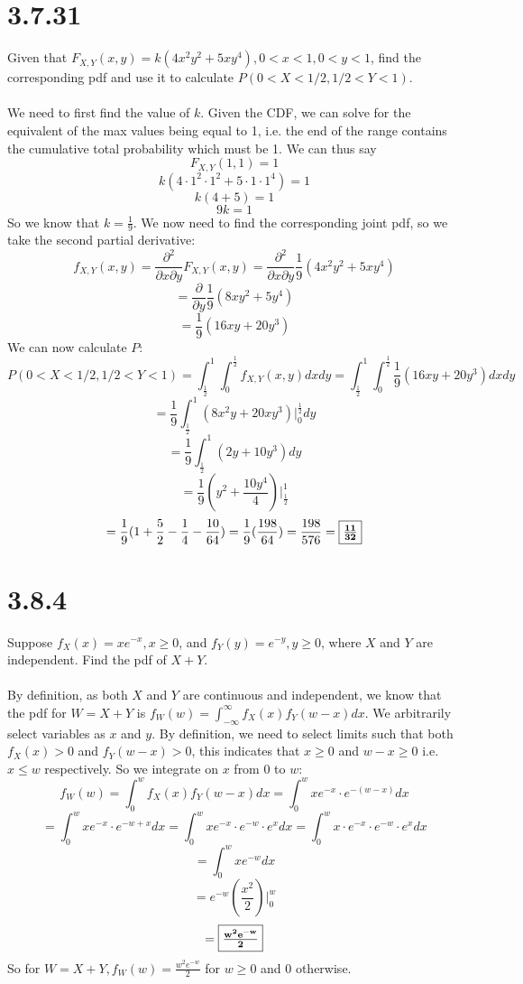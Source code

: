 \documentclass{article}
\begin{document}
{\section*{3.7.31} 
Given that \(F_{X,Y} (x, y) = k(4x^2y^2 + 5xy^4), 0 < x <1, 0 < y < 1\), find the corresponding pdf and use it to calculate \(P(0 < X < 1/2, 1/2 < Y < 1)\).
\\
\\
We need to first find the value of \(k\). Given the CDF, we can solve for the equivalent of the max values being equal to 1, i.e. the end of the range contains the cumulative total probability which must be 1. We can thus say 
\[
F_{X,Y}(1,1) = 1
\]
\[
k(4\cdot 1^2 \cdot 1^2 + 5 \cdot 1 \cdot 1^4) = 1
\]
\[
k(4 + 5) = 1
\]
\[
9k = 1
\]
So we know that \(k = \frac{1}{9}\). We now need to find the corresponding joint pdf, so we take the second partial derivative:
\[
f_{X,Y} (x,y) = \frac{\partial^2}{\partial x \partial y}F_{X,Y} (x,y) = \frac{\partial^2}{\partial x \partial y} \frac{1}{9}(4x^2y^2 + 5xy^4)
\]
\[
= \frac{\partial}{\partial y} \frac{1}{9}(8xy^2 + 5y^4)
\]
\[
= \frac{1}{9}(16xy + 20y^3)
\]
We can now calculate \(P\):
\[
P(0 < X < 1/2, 1/2 < Y < 1) = \int_{\frac{1}{2}}^{1} \int_{0}^{\frac{1}{2}} f_{X,Y} (x,y) dx dy = \int_{\frac{1}{2}}^{1} \int_{0}^{\frac{1}{2}} \frac{1}{9} (16xy + 20y^3) dx dy
\]
\[
= \frac{1}{9} \int_{\frac{1}{2}}^{1} (8x^2y + 20xy^3) \Big|_{0}^{\frac{1}{2}} dy
\]
\[
= \frac{1}{9} \int_{\frac{1}{2}}^{1} (2y + 10y^3) dy
\]
\[
= \frac{1}{9} (y^2 + \frac{10y^4}{4}) \Big|_{\frac{1}{2}}^{1}
\]
\[
= \frac{1}{9} (1 + \frac{5}{2} - \frac{1}{4} - \frac{10}{64}) = \frac{1}{9}(\frac{198}{64}) = \frac{198}{576} = \fbox{\(\mathbf{\frac{11}{32}}\)}
\]


\section*{3.8.4} 
Suppose \(f_X (x) = xe^{-x}, x \geq 0\), and \(f_Y (y) = e^{-y}, y \geq 0\), where
\(X\) and \(Y\) are independent. Find the pdf of \(X + Y\).
\\
\\
By definition, as both \(X\) and \(Y\) are continuous and independent, we know that the pdf for \(W = X + Y\) is \(f_W(w) = \int_{-\infty}^{\infty}f_X(x)f_Y(w-x)dx\). We arbitrarily select variables as \(x\) and \(y\). By definition, we need to select limits such that both \(f_X(x) > 0\) and \(f_Y(w - x) > 0\), this indicates that \(x \geq 0 \) and \(w - x \geq 0\) i.e. \(x \leq w\) respectively. So we integrate on \(x\) from 0 to \(w\):
\[
f_W(w) = \int_{0}^{w} f_X(x)f_Y(w-x)dx = \int_{0}^{w} xe^{-x} \cdot e^{-(w-x)} dx
\]
\[
= \int_{0}^{w} xe^{-x} \cdot e^{-w+x} dx = \int_{0}^{w} xe^{-x} \cdot e^{-w} \cdot e^x dx = \int_{0}^{w} x \cdot e^{-x} \cdot e^{-w} \cdot e^x dx
\]
\[
= \int_{0}^{w} xe^{-w} dx
\]
\[
= e^{-w}(\frac{x^2}{2}) \Big|_{0}^{w}
\]
\[
= \fbox{\(\mathbf{\frac{w^2e^{-w}}{2}}\)}
\]
So for \(W = X + Y, f_W(w) = \frac{w^2e^{-w}}{2}\) for \(w \geq 0\) and 0 otherwise.

}
\end{document}
